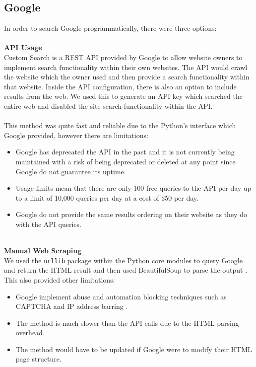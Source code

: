 \documentclass[12pt,twoside]{report}
\begin{document}
\subsection{Google}
In order to search Google programmatically, there were three options: \\\\
\textbf{API Usage}\\
Custom Search is a REST API provided by Google to allow website owners to implement search functionality within their own websites. The API would crawl the website which the owner used and then provide a search functionality within that website. Inside the API configuration, there is also an option to include results from the web. We used this to generate an API key which searched the entire web and disabled the site search functionality within the API.
\\\\
This method was quite fast and reliable due to the Python's interface which Google provided, however there are limitations:
\begin{itemize}
    \item Google has deprecated the API in the past and it is not currently being maintained with a risk of being deprecated or deleted at any point since Google do not guarantee its uptime.
    \item Usage limits mean that there are only 100 free queries to the API per day up to a limit of 10,000 queries per day at a cost of \$50 per day.
    \item Google do not provide the same results ordering on their website as they do with the API queries.
\end{itemize}
~\\
\textbf{Manual Web Scraping}\\
We used the \texttt{urllib} package within the Python core modules to query Google and return the HTML result and then used BeautifulSoup to parse the output \cite{beautifulsoup}. This also provided other limitations:
\begin{itemize}
    \item Google implement abuse and automation blocking techniques such as CAPTCHA and IP address barring \cite{captcha}.
    \item The method is much slower than the API calls due to the HTML parsing overhead.
    \item The method would have to be updated if Google were to modify their HTML page structure.
\end{itemize}
\end{document}
